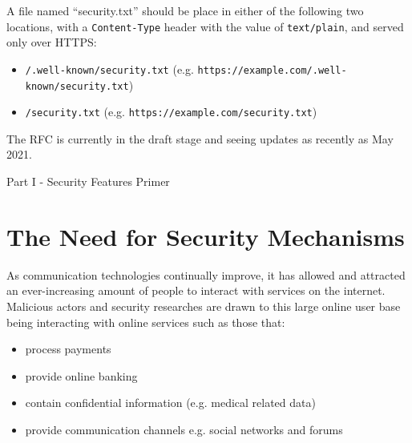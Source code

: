 \documentclass{mscreport}
\begin{document}
\vspace{0.3cm} \noindent
A file named ``security.txt'' should be place in either of the following two locations, with a \texttt{Content-Type} header with the value of \texttt{text/plain}, and served only over HTTPS:

\begin{itemize}
	\setlength\itemsep{0.1em}
	\item \texttt{/.well-known/security.txt} (e.g. \newline \texttt{https://example.com/.well-known/security.txt})
	\item \texttt{/security.txt} (e.g. \texttt{https://example.com/security.txt})
\end{itemize}

\noindent \vspace{0.3cm}
The RFC is currently in the draft stage and seeing updates as recently as May 2021.

\newpage

\vspace*{\fill}
\begin{center}
\begin{huge}
Part I - Security Features Primer
\end{huge}
\end{center}
\vspace{\fill}

\newpage

\section{The Need for Security Mechanisms}
\label{section:need_for_security_mechanisms}

As communication technologies continually improve, it has allowed and attracted an ever-increasing amount of people to interact with services on the internet. Malicious actors and security researches are drawn to this large online user base being interacting with online services such as those that:
\begin{itemize}
	\setlength\itemsep{0.1em}
	\item process payments \cite{Herman2019-zb}
	\item provide online banking \cite{Gezer2019-oy}
	\item contain confidential information (e.g. medical related data) \cite{Mrdjenovich2020-vz}
	\item provide communication channels e.g. social networks and forums
\end{itemize}
\end{document}
